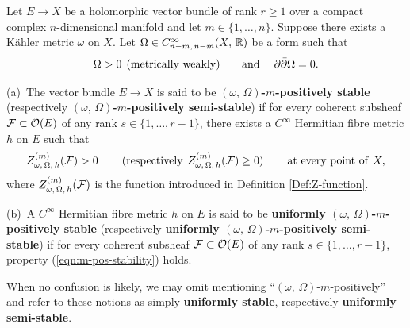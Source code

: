 \documentclass[12pt]{article}
\begin{document}
\begin{Def}\label{Def:m-pos-stability} Let $E\longrightarrow X$ be a holomorphic vector bundle of rank $r\geq 1$ over a compact complex $n$-dimensional manifold and let $m\in\{1,\dots , n\}$. Suppose there exists a K\"ahler metric $\omega$ on $X$. Let $\Omega\in C^\infty_{n-m,\,n-m}(X,\,\mathbb{R})$ be a form such that \begin{eqnarray*}\Omega>0 \hspace{1ex} \mbox{(metrically weakly) \hspace{3ex} and} \hspace{3ex} \partial\bar\partial\Omega = 0.\end{eqnarray*}

 (a)\, The vector bundle $E\longrightarrow X$ is said to be {\bf $(\omega,\,\Omega)$-$m$-positively stable} (respectively {\bf $(\omega,\,\Omega)$-$m$-positively semi-stable}) if for every coherent subsheaf ${\cal F}\subset{\cal O}(E)$ of any rank $s\in\{1,\dots , r-1\}$, there exists a $C^\infty$ Hermitian fibre metric $h$ on $E$ such that \begin{eqnarray}\label{eqn:m-pos-stability} Z_{\omega,\,\Omega,\,h}^{(m)}({\cal F})> 0 \hspace{5ex} (\mbox{respectively} \hspace{1ex} Z_{\omega,\,\Omega,\,h}^{(m)}({\cal F})\geq 0) \hspace{5ex} \mbox{at every point of}\hspace{1ex} X, \end{eqnarray} where $Z_{\omega,\,\Omega,\,h}^{(m)}({\cal F})$ is the function introduced in Definition \ref{Def:Z-function}.

\vspace{1ex}

(b)\, A $C^\infty$ Hermitian fibre metric $h$ on $E$ is said to be {\bf uniformly $(\omega,\,\Omega)$-$m$-positively stable} (respectively {\bf uniformly $(\omega,\,\Omega)$-$m$-positively semi-stable}) if for every coherent subsheaf ${\cal F}\subset{\cal O}(E)$ of any rank $s\in\{1,\dots , r-1\}$, property (\ref{eqn:m-pos-stability}) holds.   

\vspace{1ex}

When no confusion is likely, we may omit mentioning ``$(\omega,\,\Omega)$-$m$-positively'' and refer to these notions as simply {\bf uniformly stable}, respectively {\bf uniformly semi-stable}.

\end{Def}
\end{document}
